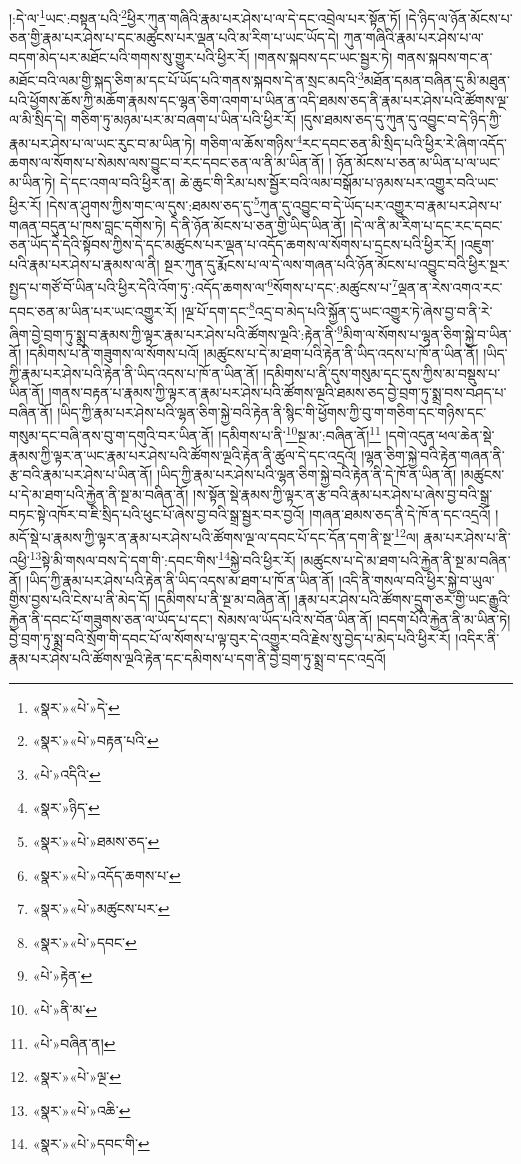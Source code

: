 །:དེ་ལ་\footnote{«སྣར་»«པེ་»དེ་}ཡང་:བསྟན་པའི་\footnote{«སྣར་»«པེ་»བརྟན་པའི་}ཕྱིར་ཀུན་གཞིའི་རྣམ་པར་ཤེས་པ་ལ་དེ་དང་འབྲེལ་པར་སྟོན་ཏོ། །དེ་ཉིད་ལ་ཉོན་མོངས་པ་ཅན་གྱི་རྣམ་པར་ཤེས་པ་དང་མཚུངས་པར་ལྡན་པའི་མ་རིག་པ་ཡང་ཡོད་དེ། ཀུན་གཞིའི་རྣམ་པར་ཤེས་པ་ལ་བདག་མེད་པར་མཐོང་པའི་གགས་སུ་གྱུར་པའི་ཕྱིར་རོ། །གནས་སྐབས་དང་ཡང་སྦྱར་ཏེ། གནས་སྐབས་གང་ན་མཐོང་བའི་ལམ་གྱི་སྐད་ཅིག་མ་དང་པོ་ཡོད་པའི་གནས་སྐབས་དེ་ན་སྲང་མདའི་\footnote{«པེ་»འདིའི་}མཐོན་དམན་བཞིན་དུ་མི་མཐུན་པའི་ཕྱོགས་ཆོས་ཀྱི་མཆོག་རྣམས་དང་ལྷན་ཅིག་འགག་པ་ཡིན་ན་འདི་ཐམས་ཅད་ནི་རྣམ་པར་ཤེས་པའི་ཚོགས་ལྔ་ལ་མི་སྲིད་དེ། གཅིག་ཏུ་མཉམ་པར་མ་བཞག་པ་ཡིན་པའི་ཕྱིར་རོ། །དུས་ཐམས་ཅད་དུ་ཀུན་དུ་འབྱུང་བ་དེ་ཉིད་ཀྱི་རྣམ་པར་ཤེས་པ་ལ་ཡང་རུང་བ་མ་ཡིན་ཏེ། གཅིག་ལ་ཆོས་གཉིས་\footnote{«སྣར་»ཉིད་}རང་དབང་ཅན་མི་སྲིད་པའི་ཕྱིར་རེ་ཞིག་འདོད་ཆགས་ལ་སོགས་པ་སེམས་ལས་བྱུང་བ་རང་དབང་ཅན་ལ་ནི་མ་ཡིན་ནོ། །
ཉོན་མོངས་པ་ཅན་མ་ཡིན་པ་ལ་ཡང་མ་ཡིན་ཏེ། དེ་དང་འགལ་བའི་ཕྱིར་ན། ཆེ་ཆུང་གི་རིམ་པས་སྦྱོར་བའི་ལམ་བསྒོམ་པ་ཉམས་པར་འགྱུར་བའི་ཡང་ཕྱིར་རོ། །དེས་ན་ཤུགས་ཀྱིས་གང་ལ་དུས་:ཐམས་ཅད་དུ་\footnote{«སྣར་»«པེ་»ཐམས་ཅད་}ཀུན་དུ་འབྱུང་བ་དེ་ཡོད་པར་འགྱུར་བ་རྣམ་པར་ཤེས་པ་གཞན་བདུན་པ་ཁས་བླང་དགོས་ཏེ། དེ་ནི་ཉོན་མོངས་པ་ཅན་གྱི་ཡིད་ཡིན་ནོ། །དེ་ལ་ནི་མ་རིག་པ་དང་རང་དབང་ཅན་ཡོད་དེ་དེའི་སྟོབས་ཀྱིས་དེ་དང་མཚུངས་པར་ལྡན་པ་འདོད་ཆགས་ལ་སོགས་པ་དྲངས་པའི་ཕྱིར་རོ། །འཇུག་པའི་རྣམ་པར་ཤེས་པ་རྣམས་ལ་ནི། སྔར་ཀུན་དུ་རྨོངས་པ་ལ་དེ་ལས་གཞན་པའི་ཉོན་མོངས་པ་འབྱུང་བའི་ཕྱིར་སྔར་སྤྱད་པ་གཙོ་བོ་ཡིན་པའི་ཕྱིར་དེའི་འོག་ཏུ་:འདོད་ཆགས་ལ་\footnote{«སྣར་»«པེ་»འདོད་ཆགས་པ་}སོགས་པ་དང་:མཚུངས་པ་\footnote{«སྣར་»«པེ་»མཚུངས་པར་}ལྡན་ན་རེས་འགའ་རང་དབང་ཅན་མ་ཡིན་པར་ཡང་འགྱུར་རོ། །ལྔ་པོ་དག་དང་\footnote{«སྣར་»«པེ་»དབང་}འདྲ་བ་མེད་པའི་སྐྱོན་དུ་ཡང་འགྱུར་ཏེ་ཞེས་བྱ་བ་ནི་རེ་ཞིག་བྱེ་བྲག་ཏུ་སྨྲ་བ་རྣམས་ཀྱི་ལྟར་རྣམ་པར་ཤེས་པའི་ཚོགས་ལྔའི་:རྟེན་ནི་\footnote{«པེ་»རྟེན་}མིག་ལ་སོགས་པ་ལྷན་ཅིག་སྐྱེ་བ་ཡིན་ནོ། །དམིགས་པ་ནི་གཟུགས་ལ་སོགས་པའོ། །མཚུངས་པ་དེ་མ་ཐག་པའི་རྟེན་ནི་ཡིད་འདས་པ་ཁོ་ན་ཡིན་ནོ། །ཡིད་ཀྱི་རྣམ་པར་ཤེས་པའི་རྟེན་ནི་ཡིད་འདས་པ་ཁོ་ན་ཡིན་ནོ། །དམིགས་པ་ནི་དུས་གསུམ་དང་དུས་ཀྱིས་མ་བསྡུས་པ་ཡིན་ནོ། །གནས་བརྟན་པ་རྣམས་ཀྱི་ལྟར་ན་རྣམ་པར་ཤེས་པའི་ཚོགས་ལྔའི་ཐམས་ཅད་བྱེ་བྲག་ཏུ་སྨྲ་བས་བཤད་པ་བཞིན་ནོ། །ཡིད་ཀྱི་རྣམ་པར་ཤེས་པའི་ལྷན་ཅིག་སྐྱེ་བའི་རྟེན་ནི་སྙིང་གི་ཕྱོགས་ཀྱི་བུ་ག་གཅིག་དང་གཉིས་དང་གསུམ་དང་བཞི་ནས་བུ་ག་དགུའི་བར་ཡིན་ནོ། །དམིགས་པ་ནི་\footnote{«པེ་»ནི་མ་}སྔ་མ་:བཞིན་ནོ།\footnote{«པེ་»བཞིན་ན།} །དགེ་འདུན་ཕལ་ཆེན་སྡེ་རྣམས་ཀྱི་ལྟར་ན་ཡང་རྣམ་པར་ཤེས་པའི་ཚོགས་ལྔའི་རྟེན་ནི་ཚུལ་དེ་དང་འདྲའོ། །ལྷན་ཅིག་སྐྱེ་བའི་རྟེན་གཞན་ནི་རྩ་བའི་རྣམ་པར་ཤེས་པ་ཡིན་ནོ། །ཡིད་ཀྱི་རྣམ་པར་ཤེས་པའི་ལྷན་ཅིག་སྐྱེ་བའི་རྟེན་ནི་དེ་ཁོ་ན་ཡིན་ནོ། །མཚུངས་པ་དེ་མ་ཐག་པའི་རྐྱེན་ནི་སྔ་མ་བཞིན་ནོ། །ས་སྟོན་སྡེ་རྣམས་ཀྱི་ལྟར་ན་རྩ་བའི་རྣམ་པར་ཤེས་པ་ཞེས་བྱ་བའི་སྒྲ་བཏང་སྟེ་འཁོར་བ་ཇི་སྲིད་པའི་ཕུང་པོ་ཞེས་བྱ་བའི་སྒྲ་སྦྱར་བར་བྱའོ། །གཞན་ཐམས་ཅད་ནི་དེ་ཁོ་ན་དང་འདྲའོ། །མདོ་སྡེ་པ་རྣམས་ཀྱི་ལྟར་ན་རྣམ་པར་ཤེས་པའི་ཚོགས་ལྔ་ལ་དབང་པོ་དང་དོན་དག་ནི་སྔ་\footnote{«སྣར་»«པེ་»ལྔ་}ལ། རྣམ་པར་ཤེས་པ་ནི་འཕྱི་\footnote{«སྣར་»«པེ་»འཆི་}སྟེ་མི་གསལ་བས་དེ་དག་གི་:དབང་གིས་\footnote{«སྣར་»«པེ་»དབང་གི་}སྐྱེ་བའི་ཕྱིར་རོ། །མཚུངས་པ་དེ་མ་ཐག་པའི་རྐྱེན་ནི་སྔ་མ་བཞིན་ནོ། །ཡིད་ཀྱི་རྣམ་པར་ཤེས་པའི་རྟེན་ནི་ཡིད་འདས་མ་ཐག་པ་ཁོ་ན་ཡིན་ནོ། །འདི་ནི་གསལ་བའི་ཕྱིར་སྐྱེ་བ་ཡུལ་གྱིས་བྱས་པའི་ངེས་པ་ནི་མེད་དོ། །དམིགས་པ་ནི་སྔ་མ་བཞིན་ནོ། །རྣམ་པར་ཤེས་པའི་ཚོགས་དྲུག་ཅར་གྱི་ཡང་རྒྱུའི་རྐྱེན་ནི་དབང་པོ་གཟུགས་ཅན་ལ་ཡོད་པ་དང་། སེམས་ལ་ཡོད་པའི་ས་བོན་ཡིན་ནོ། །བདག་པོའི་རྐྱེན་ནི་མ་ཡིན་ཏེ། བྱེ་བྲག་ཏུ་སྨྲ་བའི་སྲོག་གི་དབང་པོ་ལ་སོགས་པ་ལྟ་བུར་དེ་འགྱུར་བའི་རྗེས་སུ་བྱེད་པ་མེད་པའི་ཕྱིར་རོ། །འདིར་ནི་རྣམ་པར་ཤེས་པའི་ཚོགས་ལྔའི་རྟེན་དང་དམིགས་པ་དག་ནི་བྱེ་བྲག་ཏུ་སྨྲ་བ་དང་འདྲའོ། 